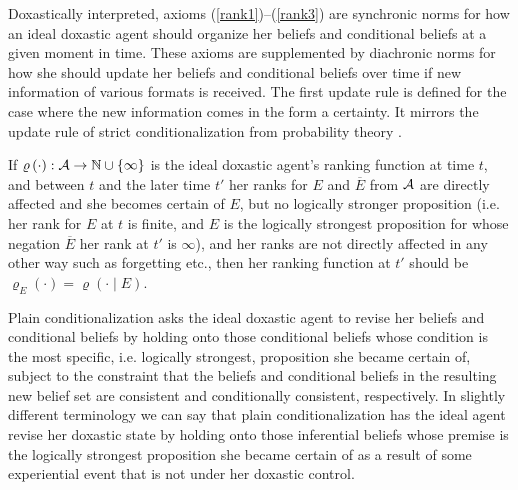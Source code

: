 Doxastically interpreted, axioms (\ref{rank1})--(\ref{rank3}) are synchronic norms for how an ideal doxastic agent should organize her beliefs and conditional beliefs at a given moment in time. These axioms are supplemented by diachronic norms for how she should update her beliefs and conditional beliefs over time if new information of various formats is received. The first update rule is defined for the case where the new information comes in the form a certainty. It mirrors the update rule of strict conditionalization from probability theory \citep{v00}.
\begin{update}\label{rankrule1}
If $\varrho\left(\cdot\right):\begin{cal}A\end{cal}\rightarrow\mathbb{N}\cup\left\{\infty\right\}$ is the ideal doxastic agent's ranking function at time $t$, and between $t$ and the later time $t'$ her ranks for $E$ and $\overline{E}$ from $\begin{cal}A\end{cal}$ are directly affected and she becomes certain of $E$, but no logically stronger proposition (i.e. her rank for $E$ at $t$ is finite, and $E$ is the logically strongest proposition for whose negation $\overline{E}$ her rank at $t'$ is $\infty$), and her ranks are not directly affected in any other way such as forgetting etc., then her ranking function at $t'$ should be $\varrho_E\left(\cdot\right)=\varrho\left(\cdot\mid E\right)$.
\end{update}
Plain conditionalization asks the ideal doxastic agent to revise her beliefs and conditional beliefs by holding onto those conditional beliefs whose condition is the most specific, i.e. logically strongest, proposition she became certain of, subject to the constraint that the beliefs and conditional beliefs in the resulting new belief set are consistent and conditionally consistent, respectively. In slightly different terminology we can say that plain conditionalization has the ideal agent revise her doxastic state by holding onto those inferential beliefs whose premise is the logically strongest proposition she became certain of as a result of some experiential event that is not under her doxastic control.

